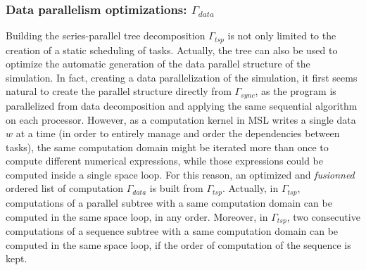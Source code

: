 \subsubsection*{Data parallelism optimizations: $\Gamma_{data}$}
Building the series-parallel tree decomposition $\Gamma_{tsp}$ is not only limited to the creation of a static scheduling of tasks. Actually, the tree can also be used to optimize the automatic generation of the data parallel structure of the simulation. In fact, creating a data parallelization of the simulation, it first seems natural to create the parallel structure directly from $\Gamma_{sync}$, as the program is parallelized from data decomposition and applying the same sequential algorithm on each processor. However, as a computation kernel in MSL writes a single data $w$ at a time (in order to entirely manage and order the dependencies between tasks), the same computation domain might be iterated more than once to compute different numerical expressions, while those expressions could be computed inside a single space loop. For this reason, an optimized and \emph{fusionned} ordered list of computation $\Gamma_{data}$ is built from $\Gamma_{tsp}$. Actually, in $\Gamma_{tsp}$, computations of a parallel subtree with a same computation domain can be computed in the same space loop, in any order. Moreover, in $\Gamma_{tsp}$, two consecutive computations of a sequence subtree with a same computation domain can be computed in the same space loop, if the order of computation of the sequence is kept.



